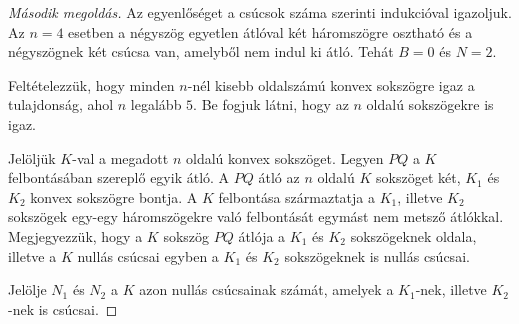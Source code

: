 \begin{proof}[Második megoldás]
Az egyenlőséget a csúcsok száma szerinti indukcióval igazoljuk. Az
$n=4$ esetben a négyszög egyetlen átlóval két háromszögre osztható
és a négyszögnek két csúcsa van, amelyből nem indul ki átló. Tehát
$B=0$ és $N=2$.\par Feltételezzük, hogy minden $n$-nél kisebb
oldalszámú konvex sokszögre igaz a tulajdonság, ahol $n$ legalább
$5$. Be fogjuk látni, hogy az $n$ oldalú sokszögekre is igaz.\par Jelöljük
$K$-val a megadott $n$ oldalú konvex sokszöget. Legyen $PQ$ a $K$
felbontásában szereplő egyik átló. A $PQ$ átló az $n$ oldalú $K$
sokszöget két, $K_{1}$ és $K_{2}$ konvex sokszögre bontja. A $K$
felbontása származtatja a $K_{1}$, illetve $K_{2}$ sokszögek egy-egy
háromszögekre való felbontását egymást nem metsző átlókkal. Megjegyezzük,
hogy a $K$ sokszög $PQ$ átlója a $K_{1}$ és $K_{2}$ sokszögeknek
oldala, illetve a $K$ nullás csúcsai egyben a $K_{1}$ és $K_{2}$
sokszögeknek is nullás csúcsai.\par Jelölje $N_{1}$ és $N_{2}$
a $K$ azon nullás csúcsainak számát, amelyek a $K_{1}$-nek, illetve
$K_{2}$-nek is csúcsai.


\end{proof}
